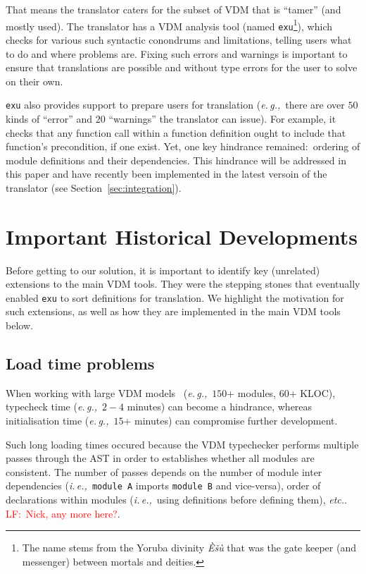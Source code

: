 \documentclass[runningheads,a4paper]{llncs}
\newcommand{\eg}{{\em e.\,g.,\/}}
\newcommand{\ie}{{\em i.\,e.,\/}}
\newcommand{\lfcomment}[1]{{\scriptsize\textcolor{red}{LF:~#1}}}
\begin{document}
That means the translator caters for the subset of VDM that is ``tamer'' (and mostly used). The translator has a VDM analysis tool (named \texttt{exu}\footnote{The name stems from the Yoruba divinity \textit{\`{E}\v{s}\`{u}} that was the gate keeper (and messenger) between mortals and deities.}), which checks for various such syntactic conondrums and limitations, telling users what to do and where problems are. Fixing such errors and warnings is important to ensure that translations are possible and without type errors for the user to solve on their own.  

\texttt{exu} also provides support to prepare users for translation (\eg~there are over \(50\) kinds of ``error'' and \(20\) ``warnings'' the translator can issue). For example, it checks that any function call within a function definition ought to include that function's precondition, if one exist. Yet, one key hindrance remained:~ordering of module definitions and their dependencies. This hindrance will be addressed in this paper and have recently been implemented in the latest versoin of the translator (see Section~\ref{sec:integration}). 


\section{Important Historical Developments}\label{sec:history}

Before getting to our solution, it is important to identify key (unrelated) extensions to the main VDM tools. They were the stepping stones that eventually enabled \texttt{exu} to sort definitions for translation. We highlight the motivation for such extensions, as well as how they are implemented in the main VDM tools below.

\subsection{Load time problems}

When working with large VDM models~\cite{emv2} (\eg~\(150\)+ modules, \(60\)+ KLOC), typecheck time (\eg~\(2-4\) minutes) can become a hindrance, whereas initialisation time (\eg~\(15\)+ minutes) can compromise further development. 

Such long loading times occured because the VDM typechecker performs multiple passes through the AST in order to establishes whether all modules are 
consistent. The number of passes depends on the number of module inter dependencies (\ie~\texttt{module A} imports \texttt{module B} and vice-versa), order of declarations within modules (\ie~using definitions before defining them), \textit{etc.}. \lfcomment{Nick, any more here?}. 
\end{document}
